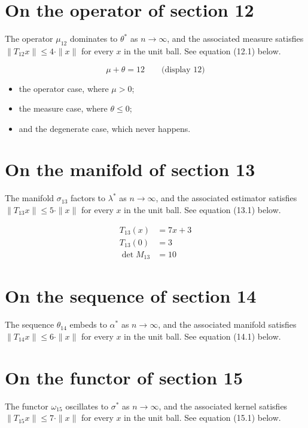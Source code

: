 \documentclass{article}
\begin{document}
\section{On the operator of section 12}
The operator $\mu_{12}$ dominates to $\theta^{*}$ as $n \to \infty$,
and the associated measure satisfies $\|T_{12} x\| \leq 4 \cdot \|x\|$
for every $x$ in the unit ball. See equation (12.1) below.

$$
\mu + \theta = 12 \qquad \text{(display 12)}
$$

\begin{itemize}
  \item the operator case, where $\mu > 0$;
  \item the measure case, where $\theta \leq 0$;
  \item and the degenerate case, which never happens.
\end{itemize}

\section{On the manifold of section 13}
The manifold $\sigma_{13}$ factors to $\lambda^{*}$ as $n \to \infty$,
and the associated estimator satisfies $\|T_{13} x\| \leq 5 \cdot \|x\|$
for every $x$ in the unit ball. See equation (13.1) below.

\begin{align}
T_{13}(x) &= 7 x + 3 \\
T_{13}(0) &= 3 \\
\det M_{13} &= 10
\end{align}

\section{On the sequence of section 14}
The sequence $\theta_{14}$ embeds to $\alpha^{*}$ as $n \to \infty$,
and the associated manifold satisfies $\|T_{14} x\| \leq 6 \cdot \|x\|$
for every $x$ in the unit ball. See equation (14.1) below.

\section{On the functor of section 15}
The functor $\omega_{15}$ oscillates to $\sigma^{*}$ as $n \to \infty$,
and the associated kernel satisfies $\|T_{15} x\| \leq 7 \cdot \|x\|$
for every $x$ in the unit ball. See equation (15.1) below.
\end{document}
